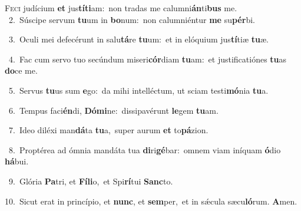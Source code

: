\lettrine{\initial\textcolor{\initialcolor}{F}}{eci} judícium \textbf{et} jus\-\textbf{tí}\-\textbf{ti}am:~\star non tradas me calumni\-\textbf{án}\-ti\textbf{bus} me.\\
{\numbfont\textcolor{\numbcolor}{~2.}}~Súscipe servum \textbf{tu}\-um in \textbf{bo}\-num:~\star non calumniéntur \textbf{me} su\-\textbf{pér}\-bi.\par
{\numbfont\textcolor{\numbcolor}{~3.}}~Oculi mei defecérunt in salu\-\textbf{tá}\-re \textbf{tu}\-um:~\star et in elóquium jus\-\textbf{tí}\-tiæ \textbf{tu}\-æ.\par
{\numbfont\textcolor{\numbcolor}{~4.}}~Fac cum servo tuo secúndum miseri\-\textbf{cór}\-diam \textbf{tu}\-am:~\star et justificatiónes \textbf{tu}\-as \textbf{do}\-ce me.\par
{\numbfont\textcolor{\numbcolor}{~5.}}~Servus \textbf{tu}\-us sum \textbf{e}\-go:~\star da mihi intelléctum, ut sciam testi\-\textbf{mó}\-nia \textbf{tu}\-a.\par
{\numbfont\textcolor{\numbcolor}{~6.}}~Tempus faci\-\textbf{én}\-di, \textbf{Dó}\-\textbf{mi}ne:~\star dissipavérunt \textbf{le}\-gem \textbf{tu}\-am.\par
{\numbfont\textcolor{\numbcolor}{~7.}}~Ideo diléxi man\-\textbf{dá}\-ta \textbf{tu}\-a,~\star super aurum \textbf{et} to\-\textbf{pá}\-zion.\par
{\numbfont\textcolor{\numbcolor}{~8.}}~Proptérea ad ómnia mandáta tua \textbf{di}\-ri\-\textbf{gé}\-bar:~\star omnem viam iníquam \textbf{ó}\-dio \textbf{há}\-bui.\par
{\numbfont\textcolor{\numbcolor}{~9.}}~Glória \textbf{Pa}\-tri, et \textbf{Fí}\-\textbf{li}o,~\star et Spi\-\textbf{rí}\-tui \textbf{Sanc}\-to.\par
{\numbfont\textcolor{\numbcolor}{10.}}~Sicut erat in princípio, et \textbf{nunc}\-, et \textbf{sem}\-per,~\star et in sǽcula sæcu\-\textbf{ló}\-rum. \textbf{A}\-men.\par
